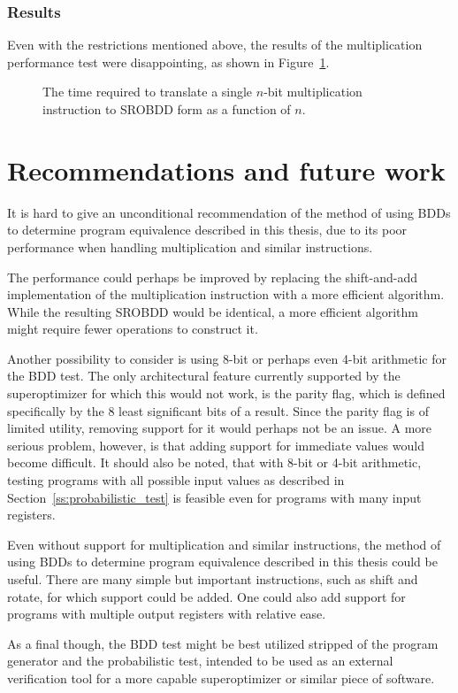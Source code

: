 \documentclass[a4paper,11pt]{kth-mag}
\begin{document}
\subsection{Results}

Even with the restrictions mentioned above, the results of the multiplication performance test were disappointing, as shown in Figure~\ref{fig:performance_mul}.

\begin{figure}
\centering

\caption{The time required to translate a single $n$-bit multiplication instruction to SROBDD form as a function of $n$.}
\label{fig:performance_mul}
\end{figure}


\chapter{Recommendations and future work}
\label{ch:recommendations_future_work}

It is hard to give an unconditional recommendation of the method of using BDDs to determine program equivalence described in this thesis, due to its poor performance when handling multiplication and similar instructions.

The performance could perhaps be improved by replacing the shift-and-add implementation of the multiplication instruction with a more efficient algorithm.
While the resulting SROBDD would be identical, a more efficient algorithm might require fewer operations to construct it.

Another possibility to consider is using 8-bit or perhaps even 4-bit arithmetic for the BDD test.
The only architectural feature currently supported by the superoptimizer for which this would not work, is the parity flag, which is defined specifically by the 8 least significant bits of a result.
Since the parity flag is of limited utility, removing support for it would perhaps not be an issue.
A more serious problem, however, is that adding support for immediate values would become difficult.
It should also be noted, that with 8-bit or 4-bit arithmetic, testing programs with all possible input values as described in Section~\ref{ss:probabilistic_test} is feasible even for programs with many input registers.

Even without support for multiplication and similar instructions, the method of using BDDs to determine program equivalence described in this thesis could be useful.
There are many simple but important instructions, such as shift and rotate, for which support could be added.
One could also add support for programs with multiple output registers with relative ease.

As a final though, the BDD test might be best utilized stripped of the program generator and the probabilistic test, intended to be used as an external verification tool for a more capable superoptimizer or similar piece of software.



\end{document}
